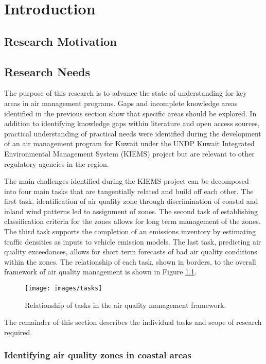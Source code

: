 \chapter{Introduction}

\section{Research Motivation}

\section{Research Needs}

The purpose of this research is to advance the state of understanding for key areas in air management programs. Gaps and incomplete knowledge areas identified in the previous section show that specific areas should be explored. In addition to identifying knowledge gaps within literature and open access sources, practical understanding of practical needs were identified during the development of an air management program for Kuwait under the UNDP Kuwait Integrated Environmental Management System (KIEMS) project but are relevant to other regulatory agencies in the region. 

The main challenges identified during the KIEMS project can be decomposed into four main tasks that are tangentially related and build off each other. The first task, identification of air quality zone through discrimination of coastal and inland wind patterns led to assignment of zones. The second task of establishing classification criteria for the zones allows for long term management of the zones. The third task supports the completion of an emissions inventory by estimating traffic densities as inputs to vehicle emission models. The last task, predicting air quality exceedances, allows for short term forecasts of bad air quality conditions within the zones. The relationship of each task, shown in borders, to the overall framework of air quality management is shown in Figure \ref{fig:tasks}.
%
\begin{figure}
\centering
\texttt{[image: images/tasks]}  %
\caption{Relationship of tasks in the air quality management framework.}
\label{fig:tasks}
\end{figure}
%
The remainder of this section describes the individual tasks and scope of research required.

\subsection{Identifying air quality zones in coastal areas}
 
